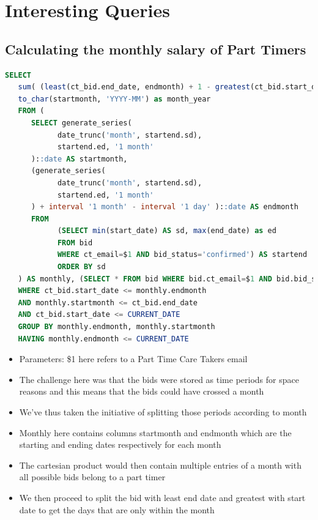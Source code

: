 \documentclass[
  paper=a4,
  ,captions=tableheading
]{scrartcl}
\providecommand{\tightlist}{%
  \setlength{\itemsep}{0pt}\setlength{\parskip}{0pt}}
\begin{document}
\hypertarget{interesting-queries}{%
\section{Interesting Queries}\label{interesting-queries}}

\hypertarget{calculating-the-monthly-salary-of-part-timers}{%
\subsection{Calculating the monthly salary of Part
Timers}\label{calculating-the-monthly-salary-of-part-timers}}

\begin{lstlisting}[language=SQL]
SELECT
   sum( (least(ct_bid.end_date, endmonth) + 1 - greatest(ct_bid.start_date, startmonth)) * ct_price) * 0.75 as full_pay,
   to_char(startmonth, 'YYYY-MM') as month_year
   FROM (
      SELECT generate_series(
            date_trunc('month', startend.sd),
            startend.ed, '1 month'
      )::date AS startmonth,
      (generate_series(
            date_trunc('month', startend.sd),
            startend.ed, '1 month'
      ) + interval '1 month' - interval '1 day' )::date AS endmonth
      FROM
            (SELECT min(start_date) AS sd, max(end_date) as ed
            FROM bid
            WHERE ct_email=$1 AND bid_status='confirmed') AS startend
            ORDER BY sd
   ) AS monthly, (SELECT * FROM bid WHERE bid.ct_email=$1 AND bid.bid_status='confirmed') as ct_bid
   WHERE ct_bid.start_date <= monthly.endmonth
   AND monthly.startmonth <= ct_bid.end_date
   AND ct_bid.start_date <= CURRENT_DATE
   GROUP BY monthly.endmonth, monthly.startmonth
   HAVING monthly.endmonth <= CURRENT_DATE
\end{lstlisting}

\begin{itemize}
\tightlist
\item
  Parameters: \$1 here refers to a Part Time Care Takers email
\item
  The challenge here was that the bids were stored as time periods for
  space reasons and this means that the bids could have crossed a month
\item
  We've thus taken the initiative of splitting those periods according
  to month
\item
  Monthly here contains columns startmonth and endmonth which are the
  starting and ending dates respectively for each month
\item
  The cartesian product would then contain multiple entries of a month
  with all possible bids belong to a part timer
\item
  We then proceed to split the bid with least end date and greatest with
  start date to get the days that are only within the month
\end{itemize}
\end{document}
